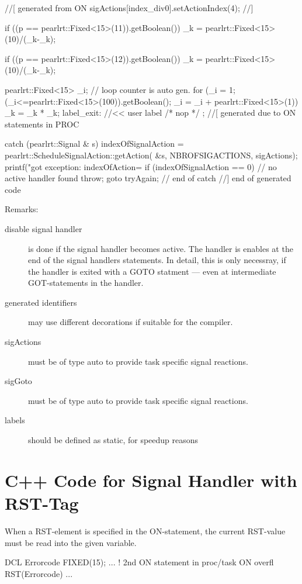 \begin{CppCode}
{{      //[ generated from ON
      sigActions[index_div0].setActionIndex(4);
      //]

      if ((p == pearlrt::Fixed<15>(11)).getBoolean()) {
         _k = pearlrt::Fixed<15>(10)/(_k-_k);
      }

      if ((p == pearlrt::Fixed<15>(12)).getBoolean()) {
         _k = pearlrt::Fixed<15>(10)/(_k-_k);
      }

      {
         pearlrt::Fixed<15> _i;    // loop counter is auto gen.
         for (_i = 1;
            (_i<=pearlrt::Fixed<15>(100)).getBoolean(); 
            _i = _i + pearlrt::Fixed<15>(1)) {
             _k =  _k * _k;
         }
      }
label_exit:    //<< user label
	/* nop */ ;
   //[ generated due to ON statements in PROC
   } catch (pearlrt::Signal & s) {
      indexOfSignalAction = pearlrt::ScheduleSignalAction::getAction(
		&s, NBROFSIGACTIONS, sigActions);
      printf("got exception: indexOfAction=%
      if (indexOfSignalAction == 0) {
        // no active handler found
        throw;
      }
      goto tryAgain;
   } // end of catch
   //] end of generated code
}
\end{CppCode}


Remarks:
\begin{description}
\item[disable signal handler] is done if the signal handler becomes
   active. The handler is enables at the end of the signal handlers
   statements. In detail, this is only necessray, if the handler is exited 
   with a GOTO statment --- even at intermediate GOT-statements in the handler.
\item[generated identifiers]  may use different decorations if
   suitable for the compiler.
\item[sigActions] must be of type auto to provide task specific 
   signal reactions.
\item[sigGoto] must be of type auto to provide task specific 
   signal reactions.
\item[labels] should be defined as static, for speedup reasons
\end{description}

\section{C++ Code for Signal Handler with RST-Tag}
When a RST-element is specified in the ON-statement, the current
RST-value must be read into the given variable.

\begin{PEARLCode}
DCL Errorcode FIXED(15);
...
   ! 2nd ON statement in proc/task
   ON overfl RST(Errorcode) ...
\end{PEARLCode}

